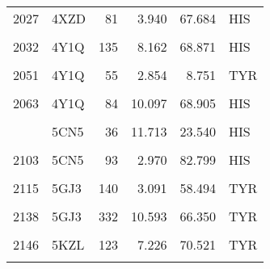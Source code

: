\begin{table}
\begin{tabular}{llrrrl}
			2027 & 4XZD & 81 & 3.940 & 67.684 & HIS\\
			\cellcolor{gray!6}{2030} & \cellcolor{gray!6}{4XZD} & \cellcolor{gray!6}{84} & \cellcolor{gray!6}{10.535} & \cellcolor{gray!6}{68.861} & \cellcolor{gray!6}{HIS}\\
			2032 & 4Y1Q & 135 & 8.162 & 68.871 & HIS\\
			\addlinespace
			\cellcolor{gray!6}{2034} & \cellcolor{gray!6}{4Y1Q} & \cellcolor{gray!6}{140} & \cellcolor{gray!6}{8.287} & \cellcolor{gray!6}{35.206} & \cellcolor{gray!6}{HIS}\\
			2051 & 4Y1Q & 55 & 2.854 & 8.751 & TYR\\
			\cellcolor{gray!6}{2060} & \cellcolor{gray!6}{4Y1Q} & \cellcolor{gray!6}{81} & \cellcolor{gray!6}{3.830} & \cellcolor{gray!6}{61.474} & \cellcolor{gray!6}{HIS}\\
			2063 & 4Y1Q & 84 & 10.097 & 68.905 & HIS\\
			\cellcolor{gray!6}{2066} & \cellcolor{gray!6}{5CN5} & \cellcolor{gray!6}{103} & \cellcolor{gray!6}{5.250} & \cellcolor{gray!6}{60.339} & \cellcolor{gray!6}{TYR}\\
			\addlinespace
			2079 & 5CN5 & 36 & 11.713 & 23.540 & HIS\\
			\cellcolor{gray!6}{2089} & \cellcolor{gray!6}{5CN5} & \cellcolor{gray!6}{64} & \cellcolor{gray!6}{3.729} & \cellcolor{gray!6}{84.840} & \cellcolor{gray!6}{HIS}\\
			2103 & 5CN5 & 93 & 2.970 & 82.799 & HIS\\
			\cellcolor{gray!6}{2105} & \cellcolor{gray!6}{5CN5} & \cellcolor{gray!6}{97} & \cellcolor{gray!6}{3.227} & \cellcolor{gray!6}{71.762} & \cellcolor{gray!6}{HIS}\\
			2115 & 5GJ3 & 140 & 3.091 & 58.494 & TYR\\
			\addlinespace
			\cellcolor{gray!6}{2122} & \cellcolor{gray!6}{5GJ3} & \cellcolor{gray!6}{239} & \cellcolor{gray!6}{3.919} & \cellcolor{gray!6}{62.993} & \cellcolor{gray!6}{TYR}\\
			2138 & 5GJ3 & 332 & 10.593 & 66.350 & TYR\\
			\cellcolor{gray!6}{2143} & \cellcolor{gray!6}{5KZL} & \cellcolor{gray!6}{103} & \cellcolor{gray!6}{10.371} & \cellcolor{gray!6}{47.478} & \cellcolor{gray!6}{TYR}\\
			2146 & 5KZL & 123 & 7.226 & 70.521 & TYR\\
			\cellcolor{gray!6}{2149} & \cellcolor{gray!6}{5KZL} & \cellcolor{gray!6}{126} & \cellcolor{gray!6}{8.028} & \cellcolor{gray!6}{69.074} & \cellcolor{gray!6}{TYR}\\

\end{tabular}
\end{table}
